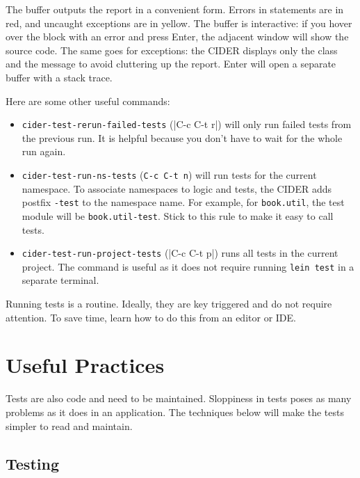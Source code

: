 The buffer outputs the report in a convenient form. Errors in statements are in red, and uncaught exceptions are in yellow. The buffer is interactive: if you hover over the block with an error and press Enter, the adjacent window will show the source code. The same goes for exceptions: the CIDER displays only the class and the message to avoid cluttering up the report. Enter will open a separate buffer with a stack trace.

Here are some other useful commands:

\begin{itemize}

\item
  \verb|cider-test-rerun-failed-tests| (\spverb|C-c C-t r|) will only run failed tests from the previous run. It is helpful because you don't have to wait for the whole run again.

\item
  \verb|cider-test-run-ns-tests| (\verb|C-c C-t n|) will run tests for the current namespace. To associate namespaces to logic and tests, the CIDER adds postfix \verb|-test| to the namespace name. For example, for \verb|book.util|, the test module will be \verb|book.util-test|. Stick to this rule to make it easy to call tests.

\item
  \verb|cider-test-run-project-tests| (\spverb|C-c C-t p|) runs all tests in the current project. The command is useful as it does not require running \verb|lein test| in a separate terminal.

\end{itemize}

Running tests is a routine. Ideally, they are key triggered and do not require attention. To save time, learn how to do this from an editor
or IDE.

\section{Useful Practices}

Tests are also code and need to be maintained. Sloppiness in tests poses as many problems as it does in an application. The techniques below will make the tests simpler to read and maintain.

\subsection{Testing}



